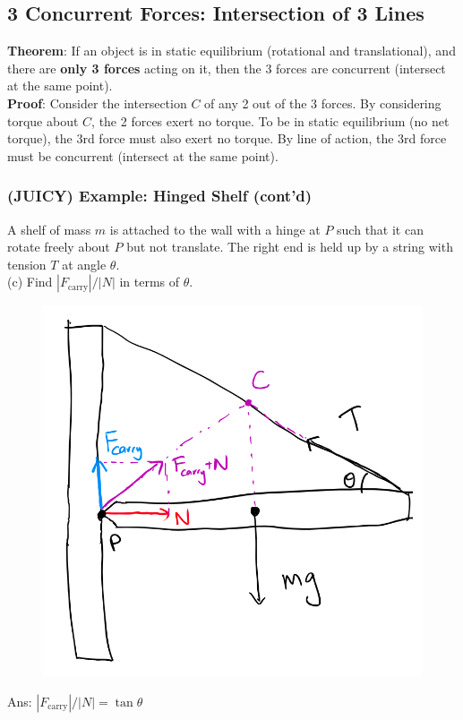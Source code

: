 \documentclass{article}
\begin{document}
\subsection{3 Concurrent Forces: Intersection of 3 Lines}
\textbf{Theorem}: If an object is in static equilibrium (rotational and translational), and there are \textbf{only 3 forces} acting on it, then the 3 forces are concurrent (intersect at the same point).\\[10pt]
\textbf{Proof}: Consider the intersection $C$ of any 2 out of the 3 forces. By considering torque about $C$, the 2 forces exert no torque. To be in static equilibrium (no net torque), the 3rd force must also exert no torque. By line of action, the 3rd force must be concurrent (intersect at the same point).
\subsubsection{(JUICY) Example: Hinged Shelf (cont'd)}
A shelf of mass $m$ is attached to the wall with a hinge at $P$ such that it can rotate freely about $P$ but not translate. The right end is held up by a string with tension $T$ at angle $\theta$. \\[5pt]
(c) Find $|F_{\text{carry}}|/|N|$ in terms of $\theta$. \\[5pt] 
{
\begin{figure} 
\includegraphics[width=\linewidth]{images/shelf.png}
\label{fig:shelf}
\end{figure}
Ans: $|F_{\text{carry}}|/|N| = \tan \theta$\\[200pt]
}
\clearpage
\end{document}
